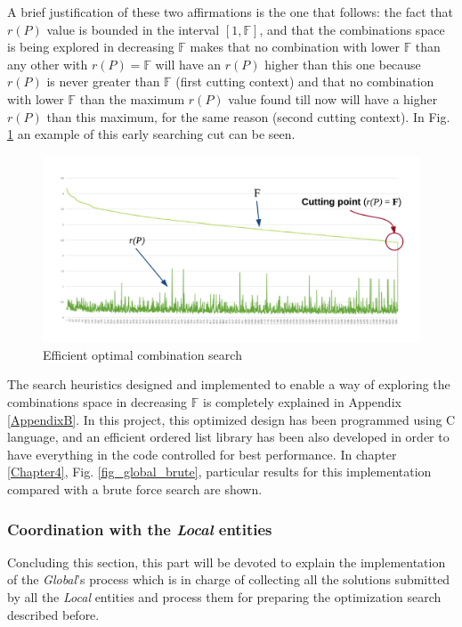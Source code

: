 A brief justification of these two affirmations is the one that follows: the fact that $r(P)$ value is bounded in the interval $\left[1, \mathbb{F}\right]$, and that the combinations space is being explored in decreasing $\mathbb{F}$ makes that no combination with lower $\mathbb{F}$ than any other with $r(P) = \mathbb{F}$ will have an $r(P)$ higher than this one because $r(P)$ is never greater than $\mathbb{F}$ (first cutting context) and that no combination with lower $\mathbb{F}$ than the maximum $r(P)$ value found till now will have a higher $r(P)$ than this maximum, for the same reason (second cutting context). In Fig. \ref{fig_r_vs_F} an example of this early searching cut can be seen.

\begin{figure}[h!]
\centering
\includegraphics[width=\linewidth]{Figures/r_vs_F.png} 
\caption{Efficient optimal combination search}
\label{fig_r_vs_F}
\end{figure}

The search heuristics designed and implemented to enable a way of exploring the combinations space in decreasing $\mathbb{F}$ is completely explained in Appendix \ref{AppendixB}. In this project, this optimized design has been programmed using C language, and an efficient ordered list library has been also developed in order to have everything in the code controlled for best performance. In chapter \ref{Chapter4}, Fig. \ref{fig_global_brute}, particular results for this implementation compared with a brute force search are shown.

\subsubsection{Coordination with the \emph{Local} entities}

Concluding this section, this part will be devoted to explain the implementation of the \emph{Global}'s process which is in charge of collecting all the solutions submitted by all the \emph{Local} entities and process them for preparing the optimization search described before.

